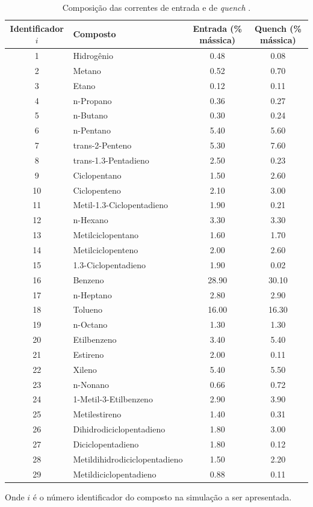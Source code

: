 \begin{table}[!htb]
\begin{center}
\caption{Composição das correntes de entrada e de \emph{quench}
\cite{Rojas2014a}.}
\label{tab:composicao}
\small
\begin{tabular}{clcc}
{Identificador $i$} & {Composto} & Entrada (\% mássica) & Quench (\% mássica)
\\
\hline
1 & Hidrogênio				& 0.48 & 0.08 \\
2 & Metano					& 0.52 & 0.70 \\
3 & Etano					& 0.12 & 0.11 \\
4 & n-Propano				& 0.36 & 0.27 \\
5 & n-Butano				& 0.30 & 0.24 \\
6 & n-Pentano				& 5.40 & 5.60 \\
7 & trans-2-Penteno			& 5.30 & 7.60\\
8 & trans-1.3-Pentadieno	& 2.50 & 0.23 \\
9 & Ciclopentano			& 1.50 & 2.60 \\
10& Ciclopenteno			& 2.10 & 3.00 \\
11& Metil-1.3-Ciclopentadieno	& 1.90 & 0.21 \\
12& n-Hexano				& 3.30 & 3.30 \\
13& Metilciclopentano		& 1.60 & 1.70 \\
14& Metilciclopenteno		& 2.00 & 2.60 \\
15& 1.3-Ciclopentadieno		& 1.90 & 0.02 \\
16& Benzeno					& 28.90 & 30.10 \\
17& n-Heptano				& 2.80 & 2.90 \\
18& Tolueno					& 16.00 & 16.30 \\
19& n-Octano				& 1.30 & 1.30 \\
20& Etilbenzeno				& 3.40 & 5.40 \\
21& Estireno				& 2.00 & 0.11 \\
22& Xileno					& 5.40 & 5.50 \\
23& n-Nonano				& 0.66 & 0.72 \\
24& 1-Metil-3-Etilbenzeno	& 2.90 & 3.90 \\
25& Metilestireno			& 1.40 & 0.31 \\
26& Dihidrodiciclopentadieno	& 1.80 & 3.00 \\
27& Diciclopentadieno		& 1.80 & 0.12 \\
28& Metildihidrodiciclopentadieno	& 1.50 & 2.20 \\
29& Metildiciclopentadieno	& 0.88 & 0.11 \\
\bottomrule
\end{tabular}
\end{center}
Onde $i$ é o número identificador do composto na simulação a ser apresentada.
\end{table}


